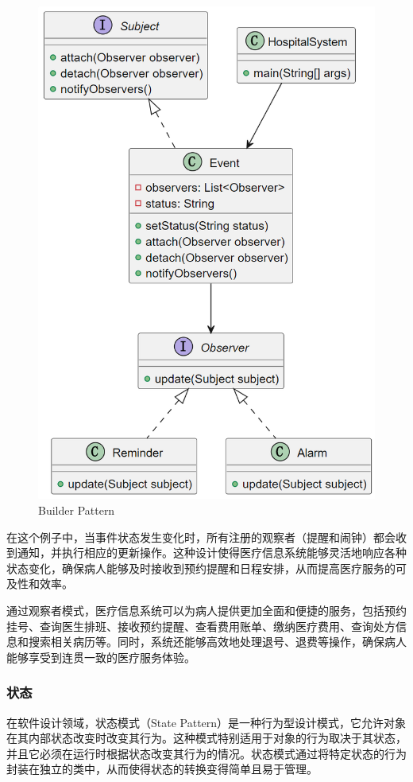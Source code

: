 \begin{figure}[htbp]
	\centering
	\includegraphics[width=0.3\textheight]{figures/13.png}
	\caption{Builder Pattern}
\end{figure}
在这个例子中，当事件状态发生变化时，所有注册的观察者（提醒和闹钟）都会收到通知，并执行相应的更新操作。这种设计使得医疗信息系统能够灵活地响应各种状态变化，确保病人能够及时接收到预约提醒和日程安排，从而提高医疗服务的可及性和效率。

通过观察者模式，医疗信息系统可以为病人提供更加全面和便捷的服务，包括预约挂号、查询医生排班、接收预约提醒、查看费用账单、缴纳医疗费用、查询处方信息和搜索相关病历等。同时，系统还能够高效地处理退号、退费等操作，确保病人能够享受到连贯一致的医疗服务体验。

\subsubsection{状态}
在软件设计领域，状态模式（State Pattern）是一种行为型设计模式，它允许对象在其内部状态改变时改变其行为。这种模式特别适用于对象的行为取决于其状态，并且它必须在运行时根据状态改变其行为的情况。状态模式通过将特定状态的行为封装在独立的类中，从而使得状态的转换变得简单且易于管理。

